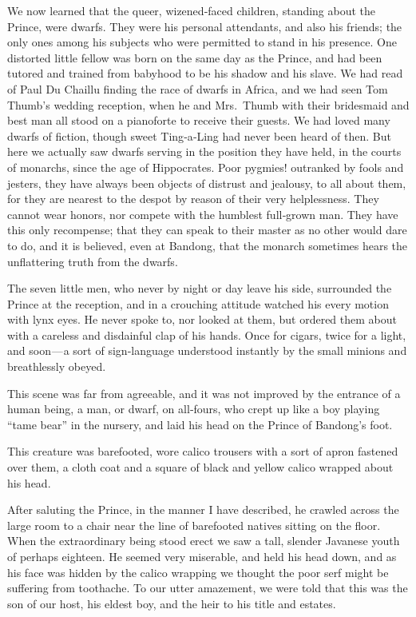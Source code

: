 \documentclass[12pt]{book}
\begin{document}
We now learned that the queer, wizened‐faced children, standing about the
Prince, were dwarfs. They were his personal attendants, and also his friends;
the only ones among his subjects who were permitted to stand in his presence.
One distorted little fellow was born on the same day as the Prince, and had been
tutored and trained from babyhood to be his shadow and his slave. We had read
of Paul Du Chaillu finding the race of dwarfs in Africa, and we had seen Tom
Thumb’s wedding reception, when he and Mrs.~Thumb with their bridesmaid and
best man all stood on a pianoforte to receive their guests. We had loved many
dwarfs of fiction, though sweet Ting‐a‐Ling had never been heard of then. But
here we actually saw dwarfs serving in the position they have held, in the courts
of monarchs, since the age of Hippocrates. Poor pygmies! outranked by fools
and jesters, they have always been objects of distrust and jealousy, to all about
them, for they are nearest to the despot by reason of their very helplessness. They
cannot wear honors, nor compete with the humblest full‐grown man. They have
this only recompense; that they can speak to their master as no other would dare
to do, and it is believed, even at Bandong, that the monarch sometimes hears the
unflattering truth from the dwarfs.

The seven little men, who never by night or day leave his side, surrounded
the Prince at the reception, and in a crouching attitude watched his every motion
with lynx eyes. He never spoke to, nor looked at them, but ordered them about
with a careless and disdainful clap of his hands. Once for cigars, twice for a light,
and soon — a sort of sign‐language understood instantly by the small minions and
breathlessly obeyed.

This scene was far from agreeable, and it was not improved by the entrance
of a human being, a man, or dwarf, on all‐fours, who crept up like a boy playing
“tame bear” in the nursery, and laid his head on the Prince of Bandong’s foot.

This creature was barefooted, wore calico trousers with a sort of apron fastened
over them, a cloth coat and a square of black and yellow calico wrapped about
his head.

After saluting the Prince, in the manner I have described, he crawled across
the large room to a chair near the line of barefooted natives sitting on the floor.
When the extraordinary being stood erect we saw a tall, slender Javanese youth
of perhaps eighteen. He seemed very miserable, and held his head down, and as
his face was hidden by the calico wrapping we thought the poor serf might be
suffering from toothache. To our utter amazement, we were told that this was
the son of our host, his eldest boy, and the heir to his title and estates.
\end{document}
